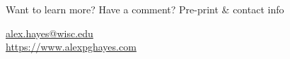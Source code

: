 \documentclass[final]{beamer}
\newlength{\sepwidth}
\newlength{\colwidth}
\newcommand{\separatorcolumn}{\begin{column}{\sepwidth}\end{column}}
\begin{document}
\begin{frame}[t]
\begin{columns}[t]
\begin{column}{\colwidth}
            \begin{block}{Want to learn more? Have a comment? Pre-print \& contact info}

                \nocite{hayes2024c}
                \printbibliography

                \begin{center}
                    \url{alex.hayes@wisc.edu} \\
                    \url{https://www.alexpghayes.com}
                \end{center}
            \end{block}


        \end{column}

        \separatorcolumn
    \end{columns}
\end{frame}
\end{document}
